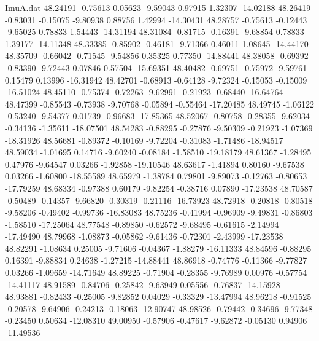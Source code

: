 \begin{filecontents}{ImuA.dat}
  48.24191   -0.75613    0.05623   -9.59043    0.97915    1.32307  -14.02188
  48.26419   -0.83031   -0.15075   -9.80938    0.88756    1.42994  -14.30431
  48.28757   -0.75613   -0.12443   -9.65025    0.78833    1.54443  -14.31194
  48.31084   -0.81715   -0.16391   -9.68854    0.78833    1.39177  -14.11348
  48.33385   -0.85902   -0.46181   -9.71366    0.46011    1.08645  -14.44170
  48.35709   -0.66042   -0.71545   -9.54856    0.35325    0.77350  -14.88441
  48.38058   -0.69392   -0.83390   -9.72443    0.07846    0.57504  -15.69351
  48.40482   -0.69751   -0.75972   -9.59761    0.15479    0.13996  -16.31942
  48.42701   -0.68913   -0.64128   -9.72324   -0.15053   -0.15009  -16.51024
  48.45110   -0.75374   -0.72263   -9.62991   -0.21923   -0.68440  -16.64764
  48.47399   -0.85543   -0.73938   -9.70768   -0.05894   -0.55464  -17.20485
  48.49745   -1.06122   -0.53240   -9.54377    0.01739   -0.96683  -17.85365
  48.52067   -0.80758   -0.28355   -9.62034   -0.34136   -1.35611  -18.07501
  48.54283   -0.88295   -0.27876   -9.50309   -0.21923   -1.07369  -18.31926
  48.56681   -0.89372   -0.10169   -9.72204   -0.31083   -1.71486  -18.94517
  48.59034   -1.01695    0.14716   -9.60240   -0.08184   -1.58510  -19.18179
  48.61367   -1.28495    0.47976   -9.64547    0.03266   -1.92858  -19.10546
  48.63617   -1.41894    0.80160   -9.67538    0.03266   -1.60800  -18.55589
  48.65979   -1.38784    0.79801   -9.89073   -0.12763   -0.80653  -17.79259
  48.68334   -0.97388    0.60179   -9.82254   -0.38716    0.07890  -17.23538
  48.70587   -0.50489   -0.14357   -9.66820   -0.30319   -0.21116  -16.73923
  48.72918   -0.20818   -0.80518   -9.58206   -0.49402   -0.99736  -16.83083
  48.75236   -0.41994   -0.96909   -9.49831   -0.86803   -1.58510  -17.25064
  48.77548   -0.89850   -0.62572   -9.68495   -0.61615   -2.14994  -17.49490
  48.79968   -1.08873   -0.05862   -9.61436   -0.72301   -2.43999  -17.23538
  48.82291   -1.08634    0.25005   -9.71606   -0.04367   -1.88279  -16.11333
  48.84596   -0.88295    0.16391   -9.88834    0.24638   -1.27215  -14.88441
  48.86918   -0.74776   -0.11366   -9.77827    0.03266   -1.09659  -14.71649
  48.89225   -0.71904   -0.28355   -9.76989    0.00976   -0.57754  -14.41117
  48.91589   -0.84706   -0.25842   -9.63949    0.05556   -0.76837  -14.15928
  48.93881   -0.82433   -0.25005   -9.82852    0.04029   -0.33329  -13.47994
  48.96218   -0.91525   -0.20578   -9.64906   -0.24213   -0.18063  -12.90747
  48.98526   -0.79442   -0.34696   -9.77348   -0.23450    0.50634  -12.08310
  49.00950   -0.57906   -0.47617   -9.62872   -0.05130    0.94906  -11.49536

\end{filecontents}
